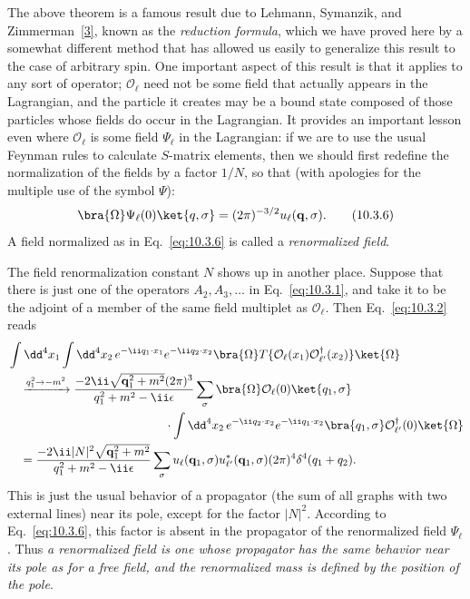 The above theorem is a famous result due to Lehmann, Symanzik, and
Zimmerman~\hyperref[ref:10.3]{[3]}, known as the \emph{reduction formula},
which we have proved here by a somewhat different method that has allowed us
easily to generalize this result to the case of arbitrary spin. One important
aspect of this result is that it applies to any sort of operator;
$\mathcal O_\ell$ need not be some field that actually appears in the
Lagrangian, and the particle it creates may be a bound state composed of those
particles whose fields do occur in the Lagrangian. It provides an important
lesson even where $\mathcal O_\ell$ is some field $\Psi_\ell$ in the
Lagrangian: if we are to use the usual Feynman rules to calculate $S$-matrix
elements, then we should first redefine the normalization of the fields by a
factor $1/N$, so that (with apologies for the multiple use of the symbol
$\Psi$):
\begin{equation}
\bra{\Omega}\Psi_\ell(0)\ket{q,\sigma}
=(2\pi)^{-3/2}u_\ell(\mathbf q,\sigma).
\tag{10.3.6}\label{eq:10.3.6}
\end{equation}
A field normalized as in Eq.~\eqref{eq:10.3.6} is called a
\emph{renormalized field}.

The field renormalization constant $N$ shows up in another place. Suppose that
there is just one of the operators $A_2,A_3,\ldots$ in Eq.~\eqref{eq:10.3.1},
and take it to be the adjoint of a member of the same field multiplet as
$\mathcal O_\ell$. Then Eq.~\eqref{eq:10.3.2} reads
\begin{align*}
&\int \dd^4x_1\int \dd^4x_2\,e^{-\ii q_1\cdot x_1}e^{-\ii q_2\cdot x_2}
\bra{\Omega}T\{\mathcal O_\ell(x_1)\mathcal O_{\ell'}^\dagger(x_2)\}
\ket{\Omega}
\\
&\quad\xrightarrow{q_1^2\to-m^2}
\frac{-2\ii\sqrt{\mathbf q_1^2+m^2}(2\pi)^3}
{q_1^2+m^2-\ii\epsilon}
\sum_\sigma\bra{\Omega}\mathcal O_\ell(0)\ket{q_1,\sigma}
\\
&\hspace{46mm}\cdot\int \dd^4x_2\,e^{-\ii q_2\cdot x_2}e^{-\ii q_1\cdot x_2}
\bra{q_1,\sigma}\mathcal O_{\ell'}^\dagger(0)\ket{\Omega}
\\
&\quad=
\frac{-2\ii|N|^2\sqrt{\mathbf q_1^2+m^2}}
{q_1^2+m^2-\ii\epsilon}
\sum_\sigma u_\ell(\mathbf q_1,\sigma)u_{\ell'}^*(\mathbf q_1,\sigma)
(2\pi)^4\delta^4(q_1+q_2).
\end{align*}
This is just the usual behavior of a propagator (the sum of all graphs with two
external lines) near its pole, except for the factor $|N|^2$. According to
Eq.~\eqref{eq:10.3.6}, this factor is absent in the propagator of the
renormalized field $\Psi_\ell$. Thus \emph{a renormalized field is one whose
propagator has the same behavior near its pole as for a free field, and the
renormalized mass is defined by the position of the pole}.

